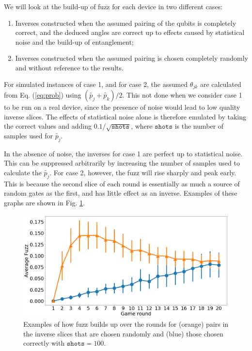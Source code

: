 \documentclass[aps,prl,twocolumn,showpacs,preprintnumbers]{revtex4-1}
\begin{document}
We will look at the build-up of fuzz for each device in two different cases:
\begin{enumerate}
\item Inverses constructed when the assumed pairing of the qubits is completely correct, and the deduced angles are correct up to effects caused by statistical noise and the build-up of entanglement;
\item Inverses constructed when the assumed pairing is chosen completely randomly and without reference to the results.
\end{enumerate}

For simulated instances of case 1, and for case 2, the assumed $\theta_{jk}$ are calculated from Eq. (\ref{eq:prob}) using $(\tilde{p_j}+\tilde{p_k})/2$. This not done when we consider case 1 to be run on a real device, since the presence of noise would lead to low quality inverse slices. The effects of statistical noise alone is therefore emulated by taking the correct values and adding $0.1/\sqrt{\mathtt{shots}}$, where $\mathtt{shots}$ is the number of samples used for $\tilde{p_j}$. 

In the absence of noise, the inverses for case 1 are perfect up to statistical noise. This can be suppressed arbitrarily by increasing the number of samples used to calculate the $\tilde{p_j}$. For case 2, however, the fuzz will rise sharply and peak early. This is because the second slice of each round is essentially as much a source of random gates as the first, and has little effect as an inverse. Examples of these graphs are shown in Fig. \ref{fig:fuzz}.

\begin{figure}[ht]
	\centering
    \includegraphics[width=\columnwidth]{figures/example_fuzz.png}
	\caption{Examples of how fuzz builds up over the rounds for (orange) pairs in the inverse slices that are chosen randomly and (blue) those chosen correctly with $\mathtt{shots}=100$.}\label{fig:fuzz}
\end{figure}
\end{document}
